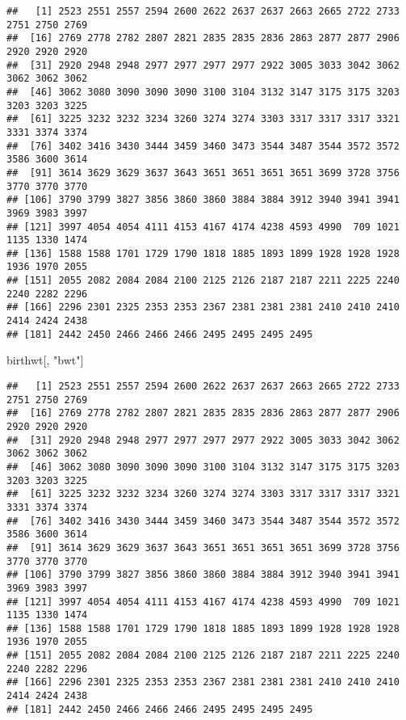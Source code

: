 \documentclass[
]{book}
\newenvironment{Shaded}{\begin{snugshade}}{\end{snugshade}}
\newcommand{\NormalTok}[1]{#1}
\newcommand{\OperatorTok}[1]{\textcolor[rgb]{0.81,0.36,0.00}{\textbf{#1}}}
\newcommand{\StringTok}[1]{\textcolor[rgb]{0.31,0.60,0.02}{#1}}
\begin{document}
\begin{Shaded}
\end{Shaded}

\begin{verbatim}
##   [1] 2523 2551 2557 2594 2600 2622 2637 2637 2663 2665 2722 2733 2751 2750 2769
##  [16] 2769 2778 2782 2807 2821 2835 2835 2836 2863 2877 2877 2906 2920 2920 2920
##  [31] 2920 2948 2948 2977 2977 2977 2977 2922 3005 3033 3042 3062 3062 3062 3062
##  [46] 3062 3080 3090 3090 3090 3100 3104 3132 3147 3175 3175 3203 3203 3203 3225
##  [61] 3225 3232 3232 3234 3260 3274 3274 3303 3317 3317 3317 3321 3331 3374 3374
##  [76] 3402 3416 3430 3444 3459 3460 3473 3544 3487 3544 3572 3572 3586 3600 3614
##  [91] 3614 3629 3629 3637 3643 3651 3651 3651 3651 3699 3728 3756 3770 3770 3770
## [106] 3790 3799 3827 3856 3860 3860 3884 3884 3912 3940 3941 3941 3969 3983 3997
## [121] 3997 4054 4054 4111 4153 4167 4174 4238 4593 4990  709 1021 1135 1330 1474
## [136] 1588 1588 1701 1729 1790 1818 1885 1893 1899 1928 1928 1928 1936 1970 2055
## [151] 2055 2082 2084 2084 2100 2125 2126 2187 2187 2211 2225 2240 2240 2282 2296
## [166] 2296 2301 2325 2353 2353 2367 2381 2381 2381 2410 2410 2410 2414 2424 2438
## [181] 2442 2450 2466 2466 2466 2495 2495 2495 2495
\end{verbatim}

\begin{Shaded}
\begin{Highlighting}[]
\NormalTok{birthwt[, }\StringTok{"bwt"}\NormalTok{]}
\end{Highlighting}
\end{Shaded}

\begin{verbatim}
##   [1] 2523 2551 2557 2594 2600 2622 2637 2637 2663 2665 2722 2733 2751 2750 2769
##  [16] 2769 2778 2782 2807 2821 2835 2835 2836 2863 2877 2877 2906 2920 2920 2920
##  [31] 2920 2948 2948 2977 2977 2977 2977 2922 3005 3033 3042 3062 3062 3062 3062
##  [46] 3062 3080 3090 3090 3090 3100 3104 3132 3147 3175 3175 3203 3203 3203 3225
##  [61] 3225 3232 3232 3234 3260 3274 3274 3303 3317 3317 3317 3321 3331 3374 3374
##  [76] 3402 3416 3430 3444 3459 3460 3473 3544 3487 3544 3572 3572 3586 3600 3614
##  [91] 3614 3629 3629 3637 3643 3651 3651 3651 3651 3699 3728 3756 3770 3770 3770
## [106] 3790 3799 3827 3856 3860 3860 3884 3884 3912 3940 3941 3941 3969 3983 3997
## [121] 3997 4054 4054 4111 4153 4167 4174 4238 4593 4990  709 1021 1135 1330 1474
## [136] 1588 1588 1701 1729 1790 1818 1885 1893 1899 1928 1928 1928 1936 1970 2055
## [151] 2055 2082 2084 2084 2100 2125 2126 2187 2187 2211 2225 2240 2240 2282 2296
## [166] 2296 2301 2325 2353 2353 2367 2381 2381 2381 2410 2410 2410 2414 2424 2438
## [181] 2442 2450 2466 2466 2466 2495 2495 2495 2495
\end{verbatim}
\end{document}
